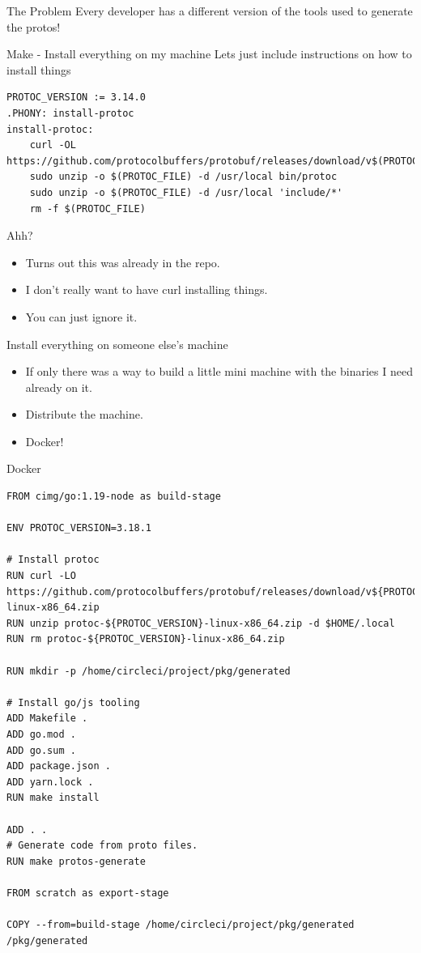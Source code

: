 \documentclass[smaller,aspectratio=169]{beamer}
\begin{document}
\begin{frame}[label={sec:org2cb7d8a}]{The Problem}
Every developer has a different version of the tools used to generate the protos!
\end{frame}
\begin{frame}[label={sec:orgb0d987e},fragile]{Make - Install everything on my machine}
 Lets just include instructions on how to install things
\begin{verbatim}
PROTOC_VERSION := 3.14.0
.PHONY: install-protoc
install-protoc:
	curl -OL https://github.com/protocolbuffers/protobuf/releases/download/v$(PROTOC_VERSION)/$(PROTOC_FILE)
	sudo unzip -o $(PROTOC_FILE) -d /usr/local bin/protoc
	sudo unzip -o $(PROTOC_FILE) -d /usr/local 'include/*'
	rm -f $(PROTOC_FILE)
\end{verbatim}
\end{frame}
\begin{frame}[label={sec:org3cd18a6}]{Ahh?}
\begin{itemize}
\item Turns out this was already in the repo.
\item I don't really want to have curl installing things.
\item You can just ignore it.
\end{itemize}
\end{frame}
\begin{frame}[label={sec:orgdf6cf9e}]{Install everything on someone else's machine}
\begin{itemize}
\item If only there was a way to build a little mini machine with the binaries I need already on it.
\item Distribute the machine.
\item Docker!
\end{itemize}
\end{frame}
\begin{frame}[label={sec:org1481ca3},fragile]{Docker}
 \begin{verbatim}
FROM cimg/go:1.19-node as build-stage

ENV PROTOC_VERSION=3.18.1

# Install protoc
RUN curl -LO https://github.com/protocolbuffers/protobuf/releases/download/v${PROTOC_VERSION}/protoc-${PROTOC_VERSION}-linux-x86_64.zip
RUN unzip protoc-${PROTOC_VERSION}-linux-x86_64.zip -d $HOME/.local
RUN rm protoc-${PROTOC_VERSION}-linux-x86_64.zip

RUN mkdir -p /home/circleci/project/pkg/generated

# Install go/js tooling
ADD Makefile .
ADD go.mod .
ADD go.sum .
ADD package.json .
ADD yarn.lock .
RUN make install

ADD . .
# Generate code from proto files.
RUN make protos-generate

FROM scratch as export-stage

COPY --from=build-stage /home/circleci/project/pkg/generated /pkg/generated
\end{verbatim}
\end{frame}
\end{document}

